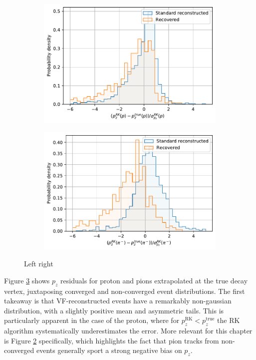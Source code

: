 \begin{figure}[t]
	\centering
	\begin{subfigure}{.45\textwidth}
		\includegraphics[width=\textwidth]{graphics/03-vertex_reconstruction/p_momentum_residual_2Dv3D_z_rel.pdf}
		\caption{}
		\label{fig:p_momentum_residual_2Dv3D_z_rel}
	\end{subfigure}
	\begin{subfigure}{.45\textwidth}
		\includegraphics[width=\textwidth]{graphics/03-vertex_reconstruction/pim_momentum_residual_2Dv3D_z_rel.pdf}
		\caption{}
		\label{fig:pim_momentum_residual_2Dv3D_z_rel}
	\end{subfigure}
	\caption[A and b.]{Left right}
	\label{fig:p_pim_momentum_residual_2Dv3D_z_rel}
\end{figure}

Figure \ref{fig:p_pim_momentum_residual_2Dv3D_z_rel} shows $p_z$ residuals for proton and pions extrapolated at the \lz true decay vertex, juxtaposing converged and non-converged event distributions.
The first takeaway is that VF-reconstructed events have a remarkably non-gaussian distribution, with a slightly positive mean and asymmetric tails. 
This is particularly apparent in the case of the proton, where for $p_z^\text{RK} < p_z^\text{true}$ the RK algorithm systematically underestimates the error.
More relevant for this chapter is Figure \ref{fig:pim_momentum_residual_2Dv3D_z_rel} specifically, which highlights the fact that pion tracks from non-converged events generally sport a strong negative bias on $p_z$.

